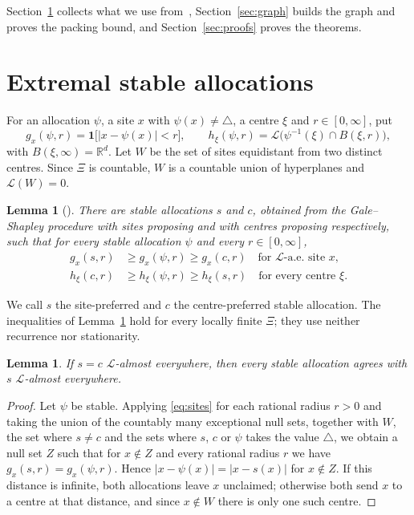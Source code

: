 \documentclass[11pt]{amsart}
\newtheorem{lemma}[theorem]{Lemma}
\theoremstyle{remark}
\numberwithin{equation}{section}
\newcommand{\R}{\mathbb{R}}
\newcommand{\Leb}{\mathcal{L}}
\newcommand{\nodef}{\triangle}
\begin{document}
Section~\ref{sec:prelim} collects what we use from~\cite{HHP}, Section~\ref{sec:graph} builds the graph and proves the packing bound, and Section~\ref{sec:proofs} proves the theorems.

\section{Extremal stable allocations}\label{sec:prelim}

For an allocation $\psi$, a site $x$ with $\psi(x)\ne\nodef$, a centre $\xi$ and $r\in[0,\infty]$, put
\[
g_x(\psi,r)=\mathbf 1\bigl[|x-\psi(x)|<r\bigr],\qquad h_\xi(\psi,r)=\Leb\bigl(\psi^{-1}(\xi)\cap B(\xi,r)\bigr),
\]
with $B(\xi,\infty)=\R^d$. Let $W$ be the set of sites equidistant from two distinct centres. Since $\Xi$ is countable, $W$ is a countable union of hyperplanes and $\Leb(W)=0$.

\begin{lemma}[{\cite[Theorem~1, Lemmas~14 and~15]{HHP}}]\label{lem:extremal}
There are stable allocations $s$ and $c$, obtained from the Gale--Shapley procedure with sites proposing and with centres proposing respectively, such that for every stable allocation $\psi$ and every $r\in[0,\infty]$,
\begin{align}
g_x(s,r)&\ge g_x(\psi,r)\ge g_x(c,r)\quad\text{for $\Leb$-a.e.\ site $x$},\label{eq:sites}\\
h_\xi(c,r)&\ge h_\xi(\psi,r)\ge h_\xi(s,r)\quad\text{for every centre $\xi$}.\label{eq:centres}
\end{align}
\end{lemma}

We call $s$ the site-preferred and $c$ the centre-preferred stable allocation. The inequalities of Lemma~\ref{lem:extremal} hold for every locally finite $\Xi$; they use neither recurrence nor stationarity.

\begin{lemma}\label{lem:sandwich}
If $s=c$ $\Leb$-almost everywhere, then every stable allocation agrees with $s$ $\Leb$-almost everywhere.
\end{lemma}

\begin{proof}
Let $\psi$ be stable. Applying \eqref{eq:sites} for each rational radius $r>0$ and taking the union of the countably many exceptional null sets, together with $W$, the set where $s\ne c$ and the sets where $s$, $c$ or $\psi$ takes the value $\nodef$, we obtain a null set $Z$ such that for $x\notin Z$ and every rational radius $r$ we have $g_x(s,r)=g_x(\psi,r)$. Hence $|x-\psi(x)|=|x-s(x)|$ for $x\notin Z$. If this distance is infinite, both allocations leave $x$ unclaimed; otherwise both send $x$ to a centre at that distance, and since $x\notin W$ there is only one such centre.
\end{proof}
\end{document}
